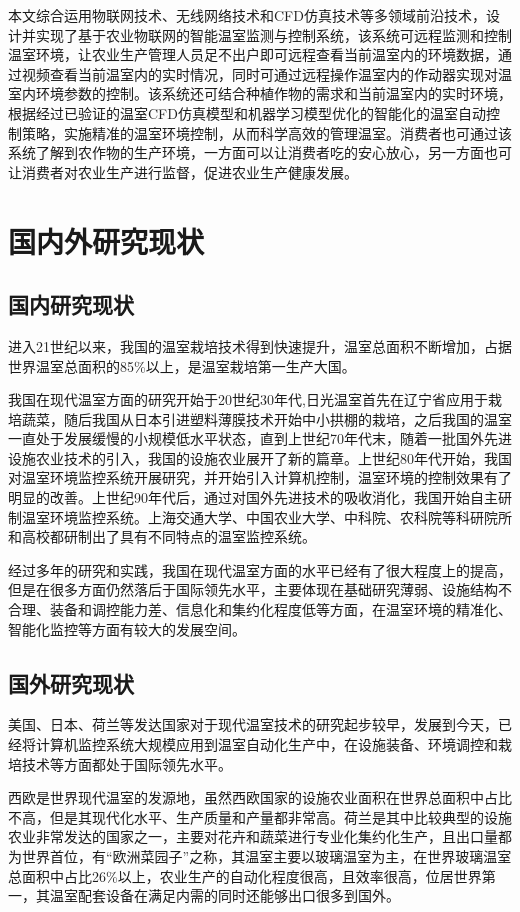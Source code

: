 本文综合运用物联网技术、无线网络技术和CFD仿真技术等多领域前沿技术，设计并实现了基于农业物联网的智能温室监测与控制系统，该系统可远程监测和控制温室环境，让农业生产管理人员足不出户即可远程查看当前温室内的环境数据，通过视频查看当前温室内的实时情况，同时可通过远程操作温室内的作动器实现对温室内环境参数的控制。该系统还可结合种植作物的需求和当前温室内的实时环境，根据经过已验证的温室CFD仿真模型和机器学习模型优化的智能化的温室自动控制策略，实施精准的温室环境控制，从而科学高效的管理温室。消费者也可通过该系统了解到农作物的生产环境，一方面可以让消费者吃的安心放心，另一方面也可让消费者对农业生产进行监督，促进农业生产健康发展。

\section{国内外研究现状}
	\subsection{国内研究现状}
进入21世纪以来，我国的温室栽培技术得到快速提升，温室总面积不断增加，占据世界温室总面积的85\%以上，是温室栽培第一生产大国。
	
我国在现代温室方面的研究开始于20世纪30年代,日光温室首先在辽宁省应用于栽培蔬菜，随后我国从日本引进塑料薄膜技术开始中小拱棚的栽培，之后我国的温室一直处于发展缓慢的小规模低水平状态，直到上世纪70年代末，随着一批国外先进设施农业技术的引入，我国的设施农业展开了新的篇章。上世纪80年代开始，我国对温室环境监控系统开展研究，并开始引入计算机控制，温室环境的控制效果有了明显的改善。上世纪90年代后，通过对国外先进技术的吸收消化，我国开始自主研制温室环境监控系统。上海交通大学、中国农业大学、中科院、农科院等科研院所和高校都研制出了具有不同特点的温室监控系统。

经过多年的研究和实践，我国在现代温室方面的水平已经有了很大程度上的提高，但是在很多方面仍然落后于国际领先水平，主要体现在基础研究薄弱、设施结构不合理、装备和调控能力差、信息化和集约化程度低等方面，在温室环境的精准化、智能化监控等方面有较大的发展空间。

	\subsection{国外研究现状}
美国、日本、荷兰等发达国家对于现代温室技术的研究起步较早，发展到今天，已经将计算机监控系统大规模应用到温室自动化生产中，在设施装备、环境调控和栽培技术等方面都处于国际领先水平。
	
西欧是世界现代温室的发源地，虽然西欧国家的设施农业面积在世界总面积中占比不高，但是其现代化水平、生产质量和产量都非常高。荷兰是其中比较典型的设施农业非常发达的国家之一，主要对花卉和蔬菜进行专业化集约化生产，且出口量都为世界首位，有“欧洲菜园子”之称，其温室主要以玻璃温室为主，在世界玻璃温室总面积中占比26\%以上，农业生产的自动化程度很高，且效率很高，位居世界第一，其温室配套设备在满足内需的同时还能够出口很多到国外。

